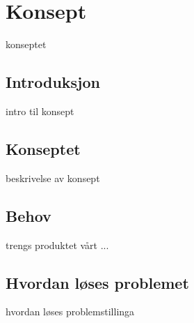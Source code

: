 \chapter{Konsept}
konseptet
\section{Introduksjon}
intro til konsept
\section{Konseptet}
beskrivelse av konsept
\section{Behov}
trengs produktet vårt ...
\section{Hvordan løses problemet}
hvordan løses problemstillinga

